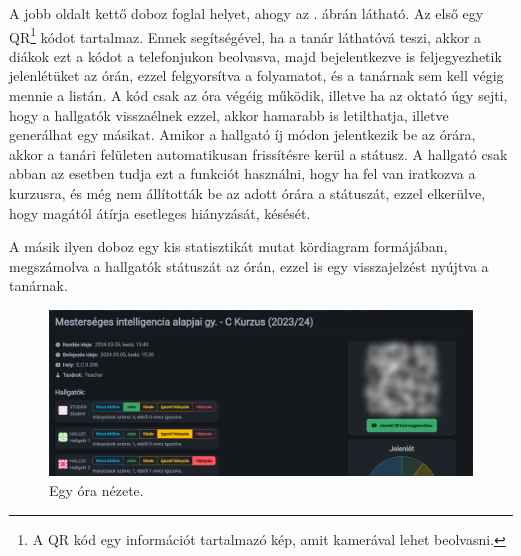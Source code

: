 \documentclass[
]{thesis-ekf}
\theoremstyle{definition}
\theoremstyle{remark}
\begin{document}
A jobb oldalt kettő doboz foglal helyet, ahogy az . ábrán látható. Az első egy QR\footnote{A QR kód egy információt tartalmazó kép, amit kamerával lehet beolvasni.\cite{QR}} kódot tartalmaz. Ennek segítségével, ha a tanár láthatóvá teszi, akkor a diákok ezt a kódot a telefonjukon beolvasva, majd bejelentkezve is feljegyezhetik jelenlétüket az órán, ezzel felgyorsítva a folyamatot, és a tanárnak sem kell végig mennie a listán. A kód csak az óra végéig működik, illetve ha az oktató úgy sejti, hogy a hallgatók visszaélnek ezzel, akkor hamarabb is letilthatja, illetve generálhat egy másikat. Amikor a hallgató íj módon jelentkezik be az órára, akkor a tanári felületen automatikusan frissítésre kerül a státusz. A hallgató csak abban az esetben tudja ezt a funkciót használni, hogy ha fel van iratkozva a kurzusra, és még nem állították be az adott órára a státuszát, ezzel elkerülve, hogy magától átírja esetleges hiányzását, késését.

A másik ilyen doboz egy kis statisztikát mutat kördiagram formájában, megszámolva a hallgatók státuszát az órán, ezzel is egy visszajelzést nyújtva a tanárnak.

\begin{figure}[ht!]
	\centering
	\includegraphics[width=15cm]{../pictures/screenshots/class_1.png}
	\caption{Egy óra nézete.}
	\label{class}
\end{figure}
\end{document}
